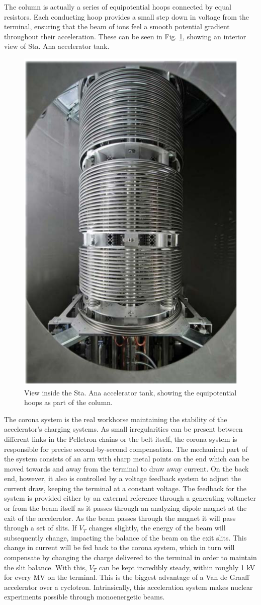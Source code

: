 \noindent The column is actually a series of equipotential hoops connected by equal resistors. Each conducting hoop provides a small step down in voltage from the terminal, ensuring that the beam of ions feel a smooth potential gradient throughout their acceleration. These can be seen in Fig. \ref{fig: column}, showing an interior view of Sta. Ana accelerator tank. 


\begin{figure}
\centering
\includegraphics[width=0.5\linewidth]{figures/inside5U.png}
\caption{View inside the Sta. Ana accelerator tank, showing the equipotential hoops as part of the column.}
\label{fig: column}
\end{figure}


The corona system is the real workhorse maintaining the stability of the accelerator's charging systems. As small irregularities can be present between different links in the Pelletron chains or the belt itself, the corona system is responsible for precise second-by-second compensation. The mechanical part of the system consists of an arm with sharp metal points on the end which can be moved towards and away from the terminal to draw away current. On the back end, however, it also is controlled by a voltage feedback system to adjust the current draw, keeping the terminal at a constant voltage. The feedback for the system is provided either by an external reference through a generating voltmeter or from the beam itself as it passes through an analyzing dipole magnet at the exit of the accelerator. As the beam passes through the magnet it will pass through a set of slits. If $V_{T}$ changes slightly, the energy of the beam will subsequently change, impacting the balance of the beam on the exit slits. This change in current will be fed back to the corona system, which in turn will compensate by changing the charge delivered to the terminal in order to maintain the slit balance. With this, $V_{T}$ can be kept incredibly steady, within roughly 1 kV for every MV on the terminal. This is the biggest advantage of a Van de Graaff accelerator over a cyclotron. Intrinsically, this acceleration system makes nuclear experiments possible through monoenergetic beams. 


